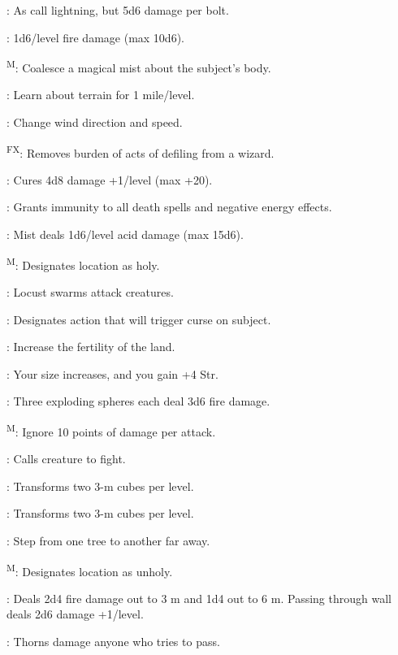 : As call lightning, but 5d6 damage per bolt.

: 1d6/level fire damage (max 10d6).

\textsuperscript{M}: Coalesce a magical mist about the subject's body.

: Learn about terrain for 1 mile/level.

: Change wind direction and speed.

\textsuperscript{FX}: Removes burden of acts of defiling from a wizard.

: Cures 4d8 damage +1/level (max +20).

: Grants immunity to all death spells and negative energy effects.

: Mist deals 1d6/level acid damage (max 15d6).

\textsuperscript{M}: Designates location as holy.

: Locust swarms attack creatures.

: Designates action that will trigger curse on subject.

: Increase the fertility of the land.

: Your size increases, and you gain +4 Str.

: Three exploding spheres each deal 3d6 fire damage.

\textsuperscript{M}: Ignore 10 points of damage per attack.

: Calls creature to fight.

: Transforms two 3-m cubes per level.

: Transforms two 3-m cubes per level.

: Step from one tree to another far away.

\textsuperscript{M}: Designates location as unholy.

: Deals 2d4 fire damage out to 3 m and 1d4 out to 6 m. Passing through wall deals 2d6 damage +1/level.

: Thorns damage anyone who tries to pass.



